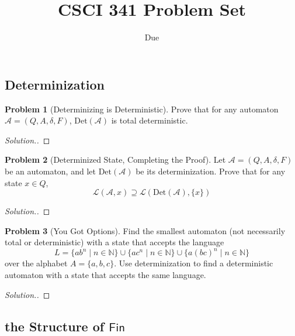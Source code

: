 \documentclass[11pt]{article}
\title{CSCI 341 Problem Set \pset}
\author{\subtitle}
\date{Due
    \duedate
}
\theoremstyle{theorem} %
\theoremstyle{definition} %
\newtheorem{problem}                    {{\color{BurntOrange}Problem}}
\theoremstyle{remark} %
\begin{document}
\maketitle

\subsection*{Determinization}

\begin{problem}
    [Determinizing is Deterministic]
    Prove that for any automaton \(\mathcal A = (Q, A, \delta, F)\), \(\mathrm{Det}(\mathcal A)\) is total deterministic.    
\end{problem}

\begin{proof}[Solution.]
    
\end{proof}

\begin{problem}
    [Determinized State, Completing the Proof]
    Let \(\mathcal A = (Q, A, \delta, F)\) be an automaton, and let \(\mathrm{Det}(\mathcal A)\) be its determinization.
    Prove that for any state \(x \in Q\), 
    \[
        \mathcal L(\mathcal A, x) \supseteq \mathcal L(\mathrm{Det}(\mathcal A), \{x\})
    \]    
\end{problem}

\begin{proof}[Solution.]
    
\end{proof}

\begin{problem}
    [You Got Options]
    Find the smallest automaton (not necessarily total or deterministic) with a state that accepts the language 
    \[
        L = \{ab^n \mid n \in \mathbb N\} \cup \{ac^n \mid n \in \mathbb N\} \cup \{a(bc)^n \mid n \in \mathbb N\}
    \]
    over the alphabet \(A = \{a,b,c\}\).
    Use determinization to find a deterministic automaton with a state that accepts the same language.  
\end{problem}

\begin{proof}[Solution.]
    
\end{proof}

\subsection*{the Structure of \(\mathsf{Fin}\)}
\end{document}
